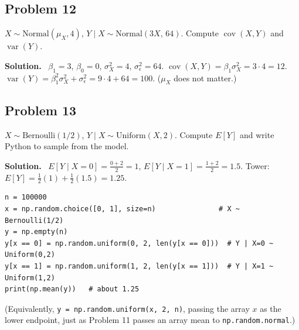 \documentclass[11pt]{article}
\newcommand{\Bern}{\text{Bernoulli}}
\newcommand{\Unif}{\text{Uniform}}
\newcommand{\Norm}{\text{Normal}}
\newcommand{\py}[1]{\texttt{#1}}
\newenvironment{soln}{\par\smallskip\noindent\textbf{Solution.}\ }{\par\medskip}
\begin{document}
\subsection*{Problem 12}
$X\sim\Norm(\mu_X,4)$, $Y\mid X\sim\Norm(3X,\,64)$. Compute $\operatorname{cov}(X,Y)$ and $\operatorname{var}(Y)$.
\begin{soln}
$\beta_1=3$, $\beta_0=0$, $\sigma_X^2=4$, $\sigma_\epsilon^2=64$.
$\operatorname{cov}(X,Y)=\beta_1\sigma_X^2=3\cdot4=12$. $\operatorname{var}(Y)=\beta_1^2\sigma_X^2+\sigma_\epsilon^2=9\cdot4+64=100$. ($\mu_X$ does not matter.)
\end{soln}

\subsection*{Problem 13}
$X\sim\Bern(1/2)$, $Y\mid X\sim\Unif(X,2)$. Compute $E[Y]$ and write Python to sample from the model.
\begin{soln}
$E[Y\mid X{=}0]=\frac{0+2}2=1$, $E[Y\mid X{=}1]=\frac{1+2}2=1.5$. Tower: $E[Y]=\frac12(1)+\frac12(1.5)=1.25$.
\begin{lstlisting}
n = 100000
x = np.random.choice([0, 1], size=n)               # X ~ Bernoulli(1/2)
y = np.empty(n)
y[x == 0] = np.random.uniform(0, 2, len(y[x == 0]))  # Y | X=0 ~ Uniform(0,2)
y[x == 1] = np.random.uniform(1, 2, len(y[x == 1]))  # Y | X=1 ~ Uniform(1,2)
print(np.mean(y))   # about 1.25
\end{lstlisting}
(Equivalently, \py{y = np.random.uniform(x, 2, n)}, passing the array $x$ as the lower endpoint, just as Problem 11 passes an array mean to \py{np.random.normal}.)
\end{soln}

\end{document}
